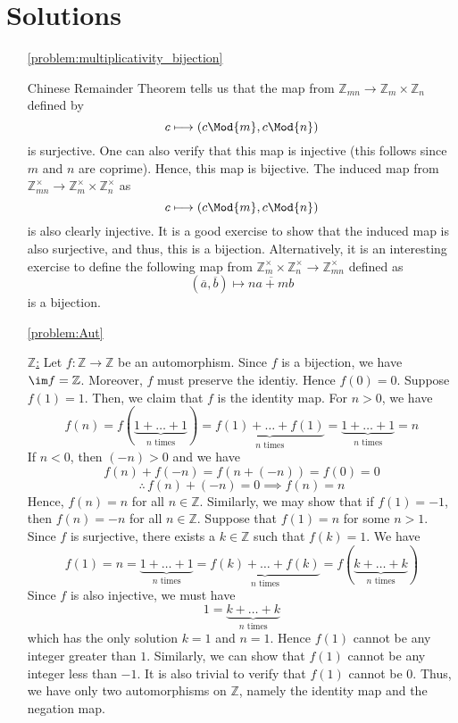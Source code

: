 \section{Solutions}

\begin{enumerate}
    \item[\ref{problem:multiplicativity_bijection}]
    \begin{solution}
        Chinese Remainder Theorem tells us that the map from $\mathbb{Z}_{mn} \to \mathbb{Z}_m \times \mathbb{Z}_n$ defined by
        \[
            c \longmapsto \left( c \Mod{m}, c \Mod{n} \right)
        \]
        is surjective. One can also verify that this map is injective (this follows since $m$ and $n$ are coprime). Hence, this map is bijective. The induced map from $\mathbb{Z}_{mn}^{\times} \to \mathbb{Z}_m^{\times} \times \mathbb{Z}_n^{\times}$ as 
        \[
            c \longmapsto \left( c \Mod{m}, c \Mod{n} \right)
        \]
        is also clearly injective. It is a good exercise to show that the induced map is also surjective, and thus, this is a bijection. Alternatively, it is an interesting exercise to define the following map from $\mathbb{Z}_m^{\times} \times \mathbb{Z}_n^{\times} \to \mathbb{Z}_{mn}^{\times}$ defined as
        \[
            (\overline{a}, \overline{b}) \longmapsto \overline{na + mb}
        \]
        is a bijection.
    \end{solution}
    
    \item[\ref{problem:Aut}]
    \begin{solution}
        \underline{$\mathbb{Z}$:} Let $f \colon \mathbb{Z} \to \mathbb{Z}$ be an automorphism. Since $f$ is a bijection, we have $\im f = \mathbb{Z}$. Moreover, $f$ must preserve the identiy. Hence $f(0) = 0$. Suppose $f(1) = 1$. Then, we claim that $f$ is the identity map. For $n > 0$, we have
        \[
            f(n) = f(\underbrace{1 + \ldots + 1}_{n\text{ times}}) = \underbrace{f(1) + \ldots + f(1)}_{n\text{ times}} = \underbrace{1 + \ldots + 1}_{n\text{ times}} = n
        \]  
        If $n<0$, then $(-n)>0$ and we have
        \[
            f(n) + f(-n) = f(n+(-n)) = f(0) = 0
        \]
        \[
            \therefore \, f(n) + (-n) = 0 \implies f(n) = n
        \] 
        Hence, $f(n) = n$ for all $n \in \mathbb{Z}$. Similarly, we may show that if $f(1) = -1$, then $f(n) = -n$ for all $n \in \mathbb{Z}$. Suppose that $f(1) = n$ for some $n > 1$. Since $f$ is surjective, there exists a $k \in \mathbb{Z}$ such that $f(k) = 1$. We have
        \[
            f(1) = n = \underbrace{1 + \ldots + 1}_{n\text{ times}} = \underbrace{f(k) + \ldots + f(k)}_{n\text{ times}} = f(\underbrace{k + \ldots + k}_{n\text{ times}})
        \]
        Since $f$ is also injective, we must have
        \[
            1 = \underbrace{k + \ldots + k}_{n\text{ times}}
        \]
        which has the only solution $k = 1$ and $n = 1$. Hence $f(1)$ cannot be any integer greater than $1$. Similarly, we can show that $f(1)$ cannot be any integer less than $-1$. It is also trivial to verify that $f(1)$ cannot be $0$. Thus, we have only two automorphisms on $\mathbb{Z}$, namely the identity map and the negation map.
        

\end{solution}
\end{enumerate}
